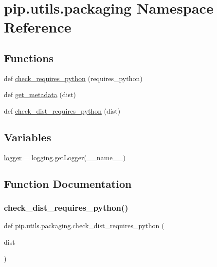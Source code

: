 \hypertarget{namespacepip_1_1utils_1_1packaging}{}\section{pip.\+utils.\+packaging Namespace Reference}
\label{namespacepip_1_1utils_1_1packaging}
\subsection*{Functions}
\begin{DoxyCompactItemize}
\item 
def \hyperlink{namespacepip_1_1utils_1_1packaging_abd5038b57cdf200a50af2fba4c7d5806}{check\+\_\+requires\+\_\+python} (requires\+\_\+python)
\item 
def \hyperlink{namespacepip_1_1utils_1_1packaging_a3383de39c28913cb0e1bf903be4e93cc}{get\+\_\+metadata} (dist)
\item 
def \hyperlink{namespacepip_1_1utils_1_1packaging_ad9057255c5414bdec1ee9bb8caf49ec4}{check\+\_\+dist\+\_\+requires\+\_\+python} (dist)
\end{DoxyCompactItemize}
\subsection*{Variables}
\begin{DoxyCompactItemize}
\item 
\hyperlink{namespacepip_1_1utils_1_1packaging_a3b65ead6832dd039e4218edef46ff791}{logger} = logging.\+get\+Logger(\+\_\+\+\_\+name\+\_\+\+\_\+)
\end{DoxyCompactItemize}


\subsection{Function Documentation}
\mbox{\label{namespacepip_1_1utils_1_1packaging_ad9057255c5414bdec1ee9bb8caf49ec4}} 
\subsubsection{\texorpdfstring{check\+\_\+dist\+\_\+requires\+\_\+python()}{check\_dist\_requires\_python()}}
{\footnotesize\ttfamily def pip.\+utils.\+packaging.\+check\+\_\+dist\+\_\+requires\+\_\+python (\begin{DoxyParamCaption}\item[{}]{dist }\end{DoxyParamCaption})}

